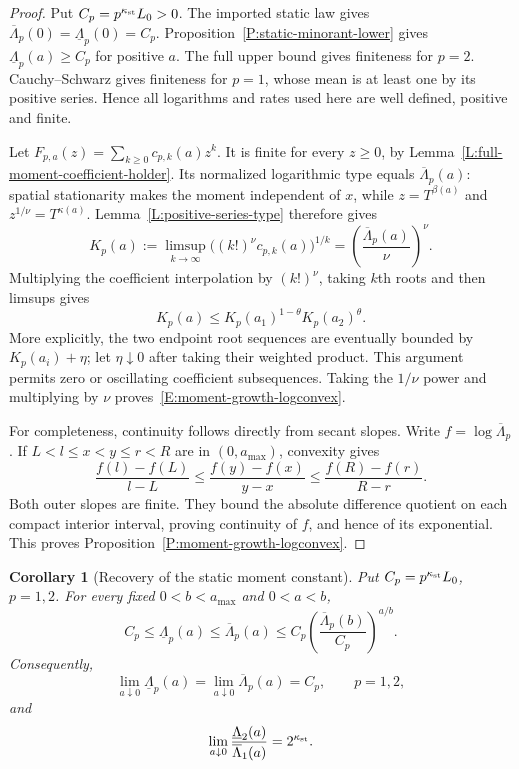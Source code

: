 \documentclass[12pt]{article}
\numberwithin{equation}{section}
\newtheorem{corollary}[theorem]{Corollary}
\theoremstyle{definition}
\begin{document}
\begin{proof}
  Put \(C_p=p^{\kappa_{\rm st}}L_0>0\).
  The imported static law gives
  \(\overline\Lambda_p(0)=\underline\Lambda_p(0)=C_p\).
  Proposition~\ref{P:static-minorant-lower} gives
  \(\underline\Lambda_p(a)\ge C_p\) for positive \(a\).
  The full upper bound gives finiteness for \(p=2\).
  Cauchy--Schwarz gives finiteness for \(p=1\), whose mean is at
  least one by its positive series. Hence all logarithms and rates
  used here are well defined, positive and finite.

  Let \(F_{p,a}(z)=\sum_{k\ge0}c_{p,k}(a)z^k\). It is finite for
  every \(z\ge0\), by Lemma~\ref{L:full-moment-coefficient-holder}.
  Its normalized logarithmic type equals
  \(\overline\Lambda_p(a)\): spatial stationarity makes the moment
  independent of \(x\), while \(z=T^{\beta(a)}\) and
  \(z^{1/\nu}=T^{\kappa(a)}\).
  Lemma~\ref{L:positive-series-type} therefore gives
  \[
    K_p(a):=\limsup_{k\to\infty}
    \big((k!)^\nu c_{p,k}(a)\big)^{1/k}
    =\left(\frac{\overline\Lambda_p(a)}{\nu}\right)^\nu.
  \]
  Multiplying the coefficient interpolation by \((k!)^\nu\),
  taking \(k\)th roots and then limsups gives
  \[
    K_p(a)\le K_p(a_1)^{1-\theta}K_p(a_2)^\theta.
  \]
  More explicitly, the two endpoint root sequences are eventually
  bounded by \(K_p(a_i)+\eta\); let \(\eta\downarrow0\) after taking
  their weighted product. This argument permits zero or oscillating
  coefficient subsequences. Taking the \(1/\nu\) power and multiplying
  by \(\nu\) proves~\eqref{E:moment-growth-logconvex}.

  For completeness, continuity follows directly from secant slopes.
  Write \(f=\log\overline\Lambda_p\). If
  \(L<l\le x<y\le r<R\) are in \((0,a_{\max})\), convexity gives
  \[
    \frac{f(l)-f(L)}{l-L}\le
    \frac{f(y)-f(x)}{y-x}\le
    \frac{f(R)-f(r)}{R-r}.
  \]
  Both outer slopes are finite. They bound the absolute difference
  quotient on each compact interior interval, proving continuity of
  \(f\), and hence of its exponential.
  This proves Proposition~\ref{P:moment-growth-logconvex}.
\end{proof}

\begin{corollary}[Recovery of the static moment constant]
  \label{C:static-moment-constant-continuity}
  Put \(C_p=p^{\kappa_{\rm st}}L_0\), \(p=1,2\).
  For every fixed \(0<b<a_{\max}\) and \(0<a<b\),
  \begin{equation}\label{E:static-constant-envelope}
    C_p\le\underline\Lambda_p(a)\le\overline\Lambda_p(a)
    \le C_p\left(\frac{\overline\Lambda_p(b)}{C_p}\right)^{a/b}.
  \end{equation}
  Consequently,
  \begin{equation}\label{E:static-constant-continuity}
    \lim_{a\downarrow0}\underline\Lambda_p(a)
    =\lim_{a\downarrow0}\overline\Lambda_p(a)=C_p,\qquad p=1,2,
  \end{equation}
  and
  \begin{equation}\label{E:static-moment-ratio-continuity}
    \lim_{a\downarrow0}
    \frac{\underline\Lambda_2(a)}{\overline\Lambda_1(a)}
    =2^{\kappa_{\rm st}}.
  \end{equation}
\end{corollary}
\end{document}
